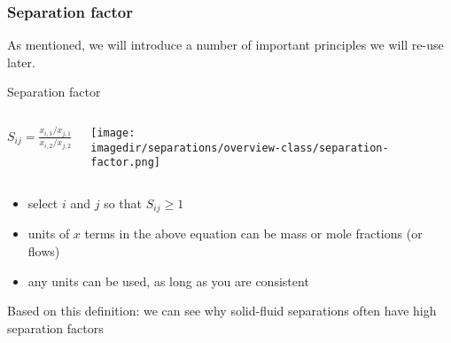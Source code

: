 \begin{frame}\frametitle{Separation factor}
	As mentioned, we will introduce a number of important principles we will re-use later.

	\begin{exampleblock}{{\color{purple} Separation factor}}
		\begin{columns}[c]
				$S_{ij} = \displaystyle \frac{x_{i,1} / x_{j,1}}{x_{i,2} / x_{j,2}}$
				\begin{center}
					\texttt{[image: \\imagedir/separations/overview-class/separation-factor.png]}
				\end{center}
		\end{columns}
	\end{exampleblock}

	\begin{itemize}
		\item	select $i$ and $j$ so that $S_{ij} \geq 1$
		\item	units of $x$ terms in the above equation can be mass or mole fractions (or flows)
		\item	any units can be used, as long as you are consistent
	\end{itemize}

	Based on this definition: we can see why solid-fluid separations often have high separation factors
\end{frame}
